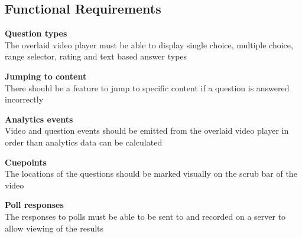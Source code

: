\subsection{Functional Requirements}
\begin{requirement}[%
 label=\textbf{F\arabic*}]
\item \textbf{Question types}  \hfill \\ The overlaid video player must be able to display single choice, multiple choice, range selector, rating and text based answer types\label{Req:Question types}
\item \textbf{Jumping to content} \hfill \\ There should be a feature to jump to specific content if a question is answered incorrectly \label{Req:Jumping to content}
\item \textbf{Analytics events} \hfill \\ Video and question events should be emitted from the overlaid video player in order than analytics data can be calculated \label{Req:Analytics events}
\item \textbf{Cuepoints} \hfill \\ The locations of the questions should be marked visually on the scrub bar of the video \label{Req:Cuepoints}
\item \textbf{Poll responses} \hfill \\ The responses to polls must be able to be sent to and recorded on a server to allow viewing of the results \label{Req:Poll responses}
\end{requirement}

